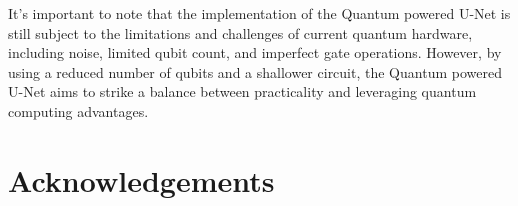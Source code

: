 \documentclass[conference]{IEEEtran}
\begin{document}
It's important to note that the implementation of the Quantum powered U-Net is still subject to the limitations and challenges of current quantum hardware, including noise, limited qubit count, and imperfect gate operations. However, by using a reduced number of qubits and a shallower circuit, the Quantum powered U-Net aims to strike a balance between practicality and leveraging quantum computing advantages.\\














\section*{Acknowledgements\label{qnn_acknowledgements}}



%

\end{document}
